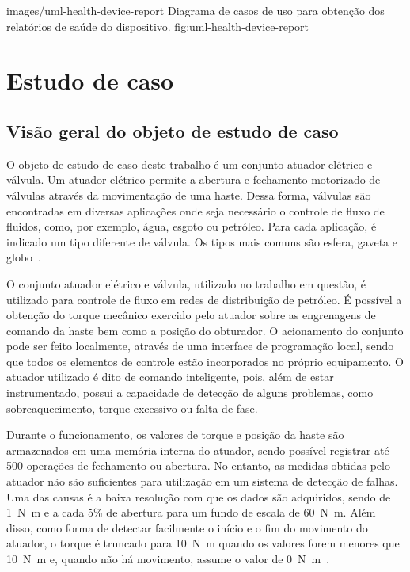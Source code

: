   {images/uml-health-device-report}
  {Diagrama de casos de uso para obtenção dos relatórios de saúde do dispositivo.}
  {fig:uml-health-device-report}


\section{Estudo de caso}
\label{sec:estudo-caso}



\subsection{Visão geral do objeto de estudo de caso}

O objeto de estudo de caso deste trabalho é um conjunto atuador elétrico e válvula. Um atuador
elétrico permite a abertura e fechamento motorizado de válvulas através da movimentação de uma
haste. Dessa forma, válvulas são encontradas em diversas aplicações onde seja necessário o controle
de fluxo de fluidos, como, por exemplo, água, esgoto ou petróleo. Para cada aplicação, é indicado um
tipo diferente de válvula. Os tipos mais comuns são esfera, gaveta e
globo~\cite{campos2006controles}.

O conjunto atuador elétrico e válvula, utilizado no trabalho em questão, é utilizado para controle
de fluxo em redes de distribuição de petróleo. É possível a obtenção do
torque mecânico exercido pelo atuador sobre as engrenagens de comando da haste bem como a posição do
obturador. O acionamento do conjunto pode ser feito localmente, através de uma interface de
programação local, sendo que todos os elementos de controle estão incorporados no próprio
equipamento. O atuador utilizado é dito de comando inteligente, pois, além de estar instrumentado,
possui a capacidade de detecção de alguns problemas, como sobreaquecimento, torque excessivo ou
falta de fase.

Durante o funcionamento, os valores de torque e posição da haste são armazenados em uma memória
interna do atuador, sendo possível registrar até \num{500} operações de fechamento ou abertura. No
entanto, as medidas obtidas pelo atuador não são suficientes para utilização em um sistema de
detecção de falhas. Uma das causas é a baixa resolução com que os dados são adquiridos, sendo de
\SI{1}{\newton\meter} e a cada 5\% de abertura para um fundo de escala de \SI{60}{\newton\meter}.
Além disso, como forma de detectar facilmente o início e o fim do movimento do atuador, o torque é
truncado para \SI{10}{\newton\meter} quando os valores forem menores que \SI{10}{\newton\meter} e,
quando não há movimento, assume o valor de \SI{0}{\newton\meter}~\cite{lazzaretti2012avaliacao}.

